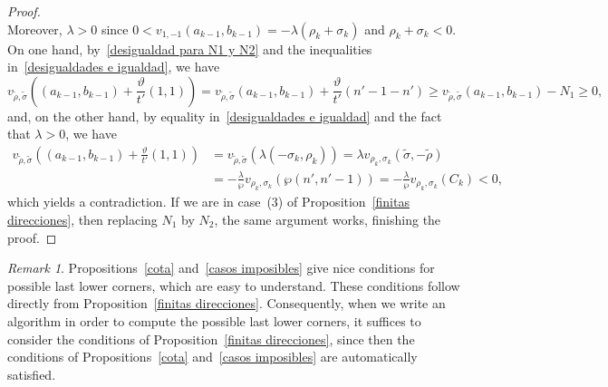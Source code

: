 \documentclass[reqno,a4paper]{amsart}
\theoremstyle{definition}
\theoremstyle{remark}
\newtheorem{remark}[theorem]{Remark}
\begin{document}
\begin{proof}
\begin{equation}
\end{equation}
Moreover, $\lambda>0$ since $0<v_{1,-1}(a_{k-1},b_{k-1})=-\lambda(\rho_k+\sigma_k)$ and $\rho_k+\sigma_k<0$. On one hand, by~\eqref{desigualdad para N1 y N2} and the inequalities in~\eqref{desigualdades e igualdad}, we have
$$
v_{\tilde{\rho},\tilde{\sigma}}\left((a_{k-1},b_{k-1})+\frac{\vartheta}{t'}(1,1)\right)=v_{\tilde{\rho},\tilde{\sigma}}(a_{k-1},b_{k-1})+ \frac{\vartheta}{t'}(n'-1-n') \ge v_{\tilde{\rho},\tilde{\sigma}}(a_{k-1},b_{k-1})-N_1\ge 0,
$$
and, on the other hand, by equality in~\eqref{desigualdades e igualdad} and the fact that $\lambda>0$, we have
\begin{align*}
v_{\tilde{\rho},\tilde{\sigma}}\left((a_{k-1},b_{k-1})+\frac{\vartheta}{t'}(1,1)\right)&=v_{\tilde{\rho},\tilde{\sigma}}(\lambda(-\sigma_k,\rho_k))= \lambda v_{\rho_k,\sigma_k}(\tilde{\sigma},-\tilde{\rho})\\
%
&=-\frac{\lambda}{\wp} v_{\rho_k,\sigma_k}(\wp(n',n'-1))=-\frac{\lambda}{\wp}v_{\rho_k,\sigma_k}(C_k)<0,
\end{align*}
which yields a contradiction. If we are in case~(3) of Proposition~\ref{finitas direcciones}, then replacing $N_1$ by $N_2$, the same argument works, finishing the proof.
\end{proof}

\begin{remark}
Propositions~\ref{cota} and~\ref{casos imposibles} give nice conditions for possible last lower corners, which are easy to understand. These conditions follow directly from Proposition~\ref{finitas direcciones}. Consequently, when we write an algorithm in order to compute the possible last lower corners, it suffices to consider the conditions of Proposition~\ref{finitas direcciones}, since then the conditions of Propositions~\ref{cota} and~\ref{casos imposibles} are automatically satisfied.
\end{remark}
\end{document}
